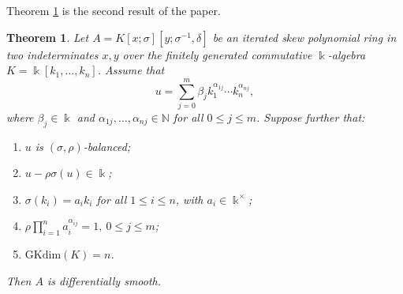 \documentclass{amsart}
\newtheorem{theorem}{Theorem}[section]
\theoremstyle{definition}
\theoremstyle{remark}
\numberwithin{equation}{section}
\begin{document}
Theorem \ref{SiSigma} is the second result of the paper.

\begin{theorem}\label{SiSigma}
Let $A=K[x;\sigma][y;\sigma^{-1},\delta]$ be an iterated skew polynomial ring in two indeterminates $x, y$ over the finitely generated commutative $\Bbbk$-algebra $K=\Bbbk[k_1,\ldots,k_n]$. Assume that
\[
u=\sum_{j=0}^m \beta_j k_1^{\alpha_{1j}}\cdots k_n^{\alpha_{nj}},
\]
where $\beta_j\in \Bbbk$ and $\alpha_{1j},\ldots,\alpha_{nj}\in \mathbb{N}$ for all $0\leq j\leq m$. Suppose further that:
\begin{enumerate}
    \item [\rm (1)] $u$ is $(\sigma,\rho)$-balanced; \label{SiSigma(1)}
    
    \item [\rm (2)] $u - \rho\sigma(u)\in \Bbbk$; \label{SiSigma(2)}
    
    \item [\rm (3)] $\sigma(k_i) = a_i k_i$ for all $1\leq i\leq n$, with $a_i\in \Bbbk^\times$; \label{SiSigma(3)}
    
    \item [\rm (4)] $\rho\displaystyle\prod_{i=1}^n a_i^{\alpha_{ij}}=1, \ 0\leq j\leq m$; \label{SiSigma(4)}
    
    \item [\rm (5)] $\mathrm{GKdim}(K) = n$. \label{SiSigma(5)}
\end{enumerate}

Then $A$ is differentially smooth.
\end{theorem}
\end{document}
